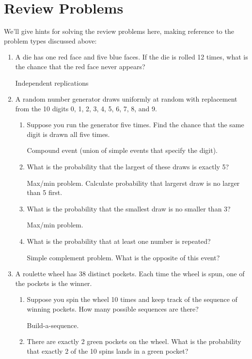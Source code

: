 \documentclass[11pt]{article}
\begin{document}
\section*{Review Problems}
We'll give hints for solving the review problems here, making reference to the problem types discussed above:
\begin{enumerate}
    \item A die has one red face and five blue faces. If the die is rolled 12 times, what is the chance that the red face never appears?

        {\color{red} Independent replications}

    \item A random number generator draws uniformly at random with replacement from the 10 digits 0, 1, 2, 3, 4, 5, 6, 7, 8, and 9. 
        \begin{enumerate}
            \item Suppose you run the generator five times. Find the chance that the same digit is drawn all five times.

                {\color{red} Compound event (union of simple events that specify the digit).}
            \item What is the probability that the largest of these draws is exactly 5?

                {\color{red} Max/min problem. Calculate probability that largerst draw is no larger than 5 first.}
            \item What is the probability that the smallest draw is no smaller than 3?

                {\color{red} Max/min problem.}
            \item What is the probability that at least one number is repeated?

                {\color{red} Simple complement problem. What is the opposite of this event?}
        \end{enumerate}

    \item A roulette wheel has 38 distinct pockets. Each time the wheel is spun, one of the pockets is the winner. 
        \begin{enumerate}
            \item Suppose you spin the wheel 10 times and keep track of the sequence of winning pockets. How many possible sequences are there?

                {\color{red} Build-a-sequence.}
            \item There are exactly 2 green pockets on the wheel. What is the probability that exactly 2 of the 10 spins lands in a green pocket?


\end{enumerate}
\end{enumerate}
\end{document}
